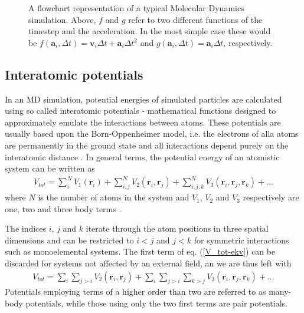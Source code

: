 \begin{figure}
\begin{center}
\endgroup
\caption{A flowchart representation of a typical Molecular Dynamics simulation. Above, $f$ and $g$ refer to two different functions of the timestep and the acceleration. In the most simple case these would be $f(\mathbf{a}_i,\Delta t) = \mathbf{v}_i\Delta t + \mathbf{a}_i\Delta t^2$ and $g(\mathbf{a}_i,\Delta t) = \mathbf{a}_i\Delta t$, respectively.} 
\label{MD-schema}
\end{center}
\end{figure}


\subsection{Interatomic potentials}

In an MD simulation, potential energies of simulated particles are calculated using so called interatomic potentials - mathematical functions designed to approximately emulate the interactions between atoms. These potentials are usually based upon the Born-Oppenheimer model, i.e. the electrons of alla atoms are permanently in the ground state and all interactions depend purely on the interatomic distance \cite{born1927quantentheorie}. In general terms, the potential energy of an atomistic system can be written as
\begin{align}
V_{tot} = \sum_i^N V_1(\mathbf{r}_i) + \sum_{i,j}^N V_2(\mathbf{r}_i, \mathbf{r}_j) +  \sum_{i,j,k}^N V_3(\mathbf{r}_i, \mathbf{r}_j, \mathbf{r}_k) + ...
\label{V_tot-ekv}
\end{align}
where $N$ is the number of atoms in the system and $V_1$, $V_2$ and $V_3$ respectively are one, two and three body terms \cite{potentialsTheory}.

The indices $i$, $j$ and $k$ iterate through the atom positions in three spatial dimensions and can be restricted to $i < j$ and $j < k$ for symmetric interactions such as monoelemental systems. The first term of eq. (\ref{V_tot-ekv}) can be discarded for systems not affected by an external field, an we are thus left with
\begin{align}
V_{tot} = \sum_i \sum_{j>i} V_2(\mathbf{r}_i, \mathbf{r}_j) + \sum_i \sum_{j>i} \sum_{k > j} V_3(\mathbf{r}_i, \mathbf{r}_j, \mathbf{r}_k) + ...
\end{align}
Potentials employing terms of a higher order than two are referred to as many-body potentials, while those using only the two first terms are pair potentials.

